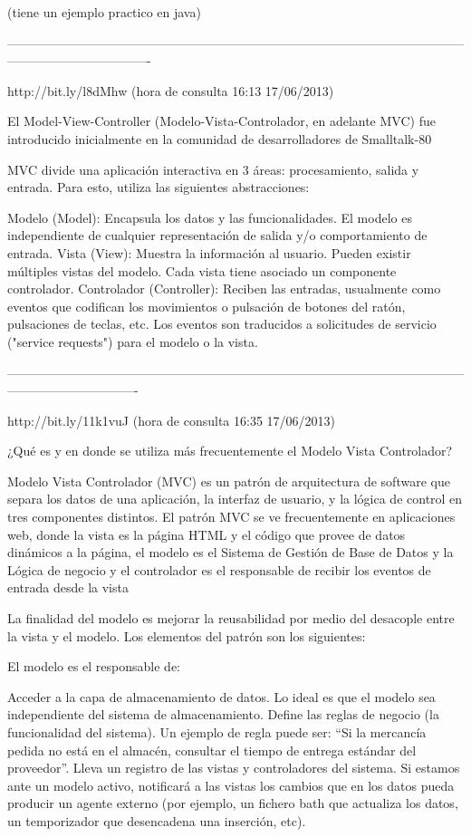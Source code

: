(tiene un ejemplo practico en java)

----------------------------------------------------------------------------------------------------------------------------------------------

http://bit.ly/l8dMhw (hora de consulta 16:13 17/06/2013)


El Model-View-Controller (Modelo-Vista-Controlador, en adelante MVC) fue introducido inicialmente en la comunidad de desarrolladores
de Smalltalk-80


MVC divide una aplicación interactiva en 3 áreas: procesamiento, salida y entrada. Para esto, utiliza las siguientes abstracciones:

    Modelo (Model): Encapsula los datos y las funcionalidades. El modelo es independiente de cualquier representación de salida y/o 
     comportamiento de entrada.
    Vista (View): Muestra la información al usuario. Pueden existir múltiples vistas del modelo. Cada vista tiene asociado un componente 
     controlador.
    Controlador (Controller): Reciben las entradas, usualmente como eventos que codifican los movimientos o pulsación de botones del 
     ratón, pulsaciones de teclas, etc. Los eventos son traducidos a solicitudes de servicio ("service requests") para el modelo o la vista.

-------------------------------------------------------------------------------------------------------------------------------------------


http://bit.ly/11k1vuJ (hora de consulta 16:35 17/06/2013)

¿Qué es y en donde se utiliza más frecuentemente el Modelo Vista Controlador?

Modelo Vista Controlador (MVC) es un patrón de arquitectura de software que separa los datos de una aplicación, la interfaz de usuario, 
y la lógica de control en tres componentes distintos. El patrón MVC se ve frecuentemente en aplicaciones web, donde la vista es la 
página HTML y el código que provee de datos dinámicos a la página, el modelo es el Sistema de Gestión de Base de Datos y la Lógica de 
negocio y el controlador es el responsable de recibir los eventos de entrada desde la vista

La finalidad del modelo es mejorar la reusabilidad por medio del desacople entre la vista y el modelo. Los elementos del patrón son
los siguientes:

El modelo es el responsable de:

    Acceder a la capa de almacenamiento de datos. Lo ideal es que el modelo sea independiente del sistema de almacenamiento.
    Define las reglas de negocio (la funcionalidad del sistema). Un ejemplo de regla puede ser: “Si la mercancía pedida no está en 
    el almacén, consultar el tiempo de entrega estándar del proveedor”.
    Lleva un registro de las vistas y controladores del sistema.
    Si estamos ante un modelo activo, notificará a las vistas los cambios que en los datos pueda producir un agente externo (por 
    ejemplo, un fichero bath que actualiza los datos, un temporizador que desencadena una inserción, etc).

